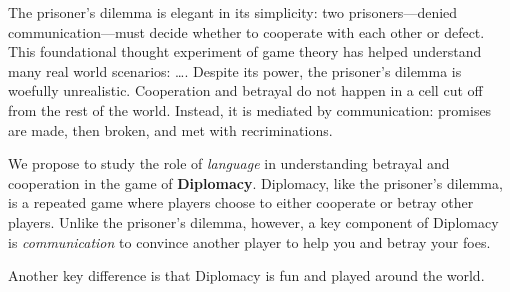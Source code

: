 
The prisoner's dilemma is elegant in its simplicity: two prisoners---denied communication---must decide whether to cooperate with each other or defect.  This foundational thought experiment of game theory has helped understand many real world scenarios: \dots .  Despite its power, the prisoner's dilemma is woefully unrealistic.  Cooperation and betrayal do not happen in a cell cut off from the rest of the world.  Instead, it is mediated by communication: promises are made, then broken, and met with recriminations.  

We propose to study the role of \emph{language} in understanding betrayal and cooperation in the game of {\bf Diplomacy}.  Diplomacy, like the prisoner's dilemma, is a repeated game where players choose to either cooperate or betray other players.  Unlike the prisoner's dilemma, however, a key component of Diplomacy is \emph{communication} to convince another player to help you and betray your foes.

Another key difference is that Diplomacy is fun and played around the world.  